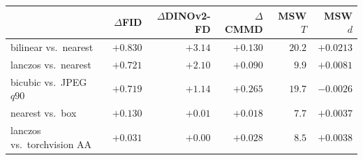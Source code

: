 \begin{tabular}{lrrrrr}
\toprule
& $\Delta$FID & $\Delta$DINOv2-FD & $\Delta$CMMD & MSW $T$ & MSW $d$ \\
\midrule
bilinear vs.\ nearest & $+0.830$ & $+3.14$ & $+0.130$ & $20.2$ & $+0.0213$ \\
lanczos vs.\ nearest & $+0.721$ & $+2.10$ & $+0.090$ & $9.9$ & $+0.0081$ \\
bicubic vs.\ JPEG\,$q90$ & $+0.719$ & $+1.14$ & $+0.265$ & $19.7$ & $-0.0026$ \\
nearest vs.\ box & $+0.130$ & $+0.01$ & $+0.018$ & $7.7$ & $+0.0037$ \\
lanczos vs.\ torchvision AA & $+0.031$ & $+0.00$ & $+0.028$ & $8.5$ & $+0.0038$ \\
\bottomrule
\end{tabular}
